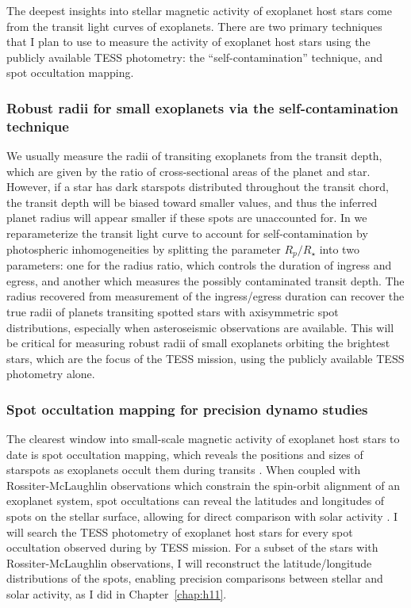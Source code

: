 The deepest insights into stellar magnetic activity of exoplanet host stars come from the transit light curves of exoplanets. There are two primary techniques that I plan to use to measure the activity of exoplanet host stars using the publicly available TESS photometry: the ``self-contamination'' technique, and spot occultation mapping. 

\subsubsection{Robust radii for small exoplanets via the self-contamination technique}

We usually measure the radii of transiting exoplanets from the transit depth, which are given by the ratio of cross-sectional areas of the planet and star. However, if a star has dark starspots distributed throughout the transit chord, the transit depth will be biased toward smaller values, and thus the inferred planet radius will appear smaller if these spots are unaccounted for. In \citet{Morris2018f, Morris2018g} we reparameterize the transit light curve to account for self-contamination by photospheric inhomogeneities by splitting the parameter $R_p/R_\star$ into two parameters: one for the radius ratio, which controls the duration of ingress and egress, and another which measures the possibly contaminated transit depth. The radius recovered from measurement of the ingress/egress duration can recover the true radii of planets transiting spotted stars with axisymmetric spot distributions, especially when asteroseismic observations are available. This will be critical for measuring robust radii of small exoplanets orbiting the brightest stars, which are the focus of the TESS mission, using the publicly available TESS photometry alone.

\subsubsection{Spot occultation mapping for precision dynamo studies}

The clearest window into small-scale magnetic activity of exoplanet host stars to date is spot occultation mapping, which reveals the positions and sizes of starspots as exoplanets occult them during transits \citep{Sanchis-Ojeda2011}. When coupled with Rossiter-McLaughlin observations which constrain the spin-orbit alignment of an exoplanet system, spot occultations can reveal the latitudes and longitudes of spots on the stellar surface, allowing for direct comparison with solar activity \citep[][see Chapter~\ref{chap:h11}]{Winn2010, Morris2017a}. I will search the TESS photometry of exoplanet host stars for every spot occultation observed during by TESS mission. For a subset of the stars with Rossiter-McLaughlin observations, I will reconstruct the latitude/longitude distributions of the spots, enabling precision comparisons between stellar and solar activity, as I did in Chapter~\ref{chap:h11}. 

